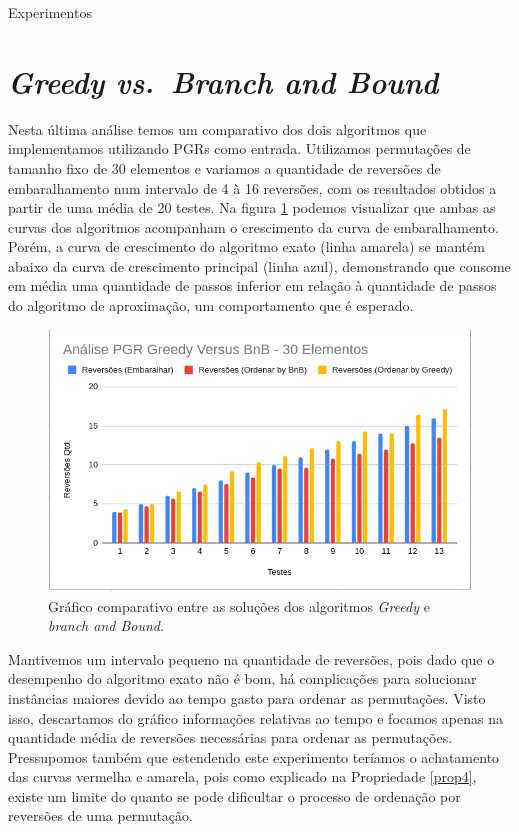 \begin{chapter}{Experimentos}
\section{\textit{Greedy vs.~Branch and Bound}}


Nesta última análise temos um comparativo dos dois algoritmos que implementamos utilizando PGRs como entrada. Utilizamos permutações de tamanho fixo de 30 elementos e variamos a quantidade de reversões de embaralhamento num intervalo de 4 à 16 reversões, com os resultados obtidos a partir de uma média de 20 testes. Na figura \ref{Grafico7} podemos visualizar que ambas as curvas dos algoritmos acompanham o crescimento da curva de embaralhamento. Porém, a curva de crescimento do algoritmo exato (linha amarela) se mantém abaixo da curva de crescimento principal (linha azul), demonstrando que consome em média uma quantidade de passos inferior em relação à quantidade de passos do algoritmo de aproximação, um comportamento que é esperado.

\begin{figure}[H]
  \centering
  \begin{minipage}[t]{0.6\textwidth}
    \includegraphics[width=\textwidth]{Imagens/Analises/BG_PGR.png}
    \caption{\label{Grafico7} Gráfico comparativo entre as soluções dos algoritmos \textit{Greedy} e \textit{branch and Bound}.}
  \end{minipage}
\end{figure}
    
Mantivemos um intervalo pequeno na quantidade de reversões, pois dado que o desempenho do algoritmo exato não é bom, há complicações para solucionar instâncias maiores devido ao tempo gasto para ordenar as permutações. Visto isso, descartamos do gráfico informações relativas ao tempo e focamos apenas na quantidade média de reversões necessárias para ordenar as permutações. Pressupomos também que estendendo este experimento teríamos o achatamento das curvas vermelha e amarela, pois como explicado na Propriedade \ref{prop4}, existe um limite do quanto se pode dificultar o processo de ordenação por reversões de uma permutação. 


\end{chapter}
